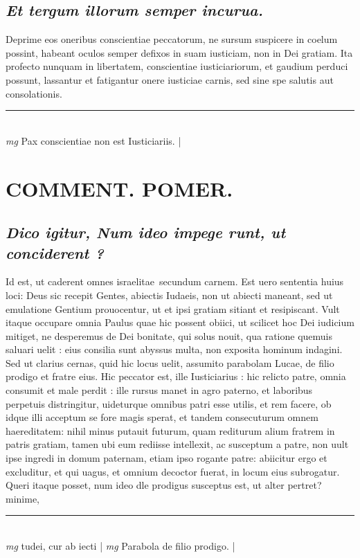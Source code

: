 \documentclass{article}
\begin{document}
\begin{pages}
\subsection*{\textit{Et tergum illorum semper incurua. }}\pstart Deprime eos oneribus conscientiae peccatorum, ne sursum suspicere in coelum possint, habeant oculos semper defixos in suam iusticiam, non in Dei gratiam. Ita profecto nunquam in libertatem, conscientiae iusticiariorum, et gaudium perduci possunt, lassantur et fatigantur onere iusticiae carnis, sed sine spe salutis aut consolationis.   \pend
\vspace{0.5cm}\noindent
\vspace{0.2cm}\rule{1cm}{0.2pt}\\ 
\hspace{0.2cm}\textit{mg}
\footnotesize Pax conscientiae non est Iusticiariis.  
\normalsize| 
\section*{COMMENT. POMER.  }
{}
\subsection*{\textit{Dico igitur, Num ideo impege runt, ut conciderent ? }}\pstart Id est, ut caderent omnes israelitae secundum carnem. Est uero sententia huius loci: Deus sic recepit Gentes, abiectis Iudaeis, non ut abiecti maneant, sed ut emulatione Gentium prouocentur, ut et ipsi gratiam sitiant et resipiscant. Vult itaque occupare omnia Paulus quae hic possent obiici, ut scilicet hoc Dei iudicium mitiget, ne desperemus de Dei bonitate, qui solus nouit, qua ratione quemuis saluari uelit : eius consilia sunt abyssus multa, non exposita hominum indagini. Sed ut clarius cernas, quid hic locus uelit, assumito parabolam Lucae, de filio prodigo et fratre eius. Hic peccator est, ille Iusticiarius : hic relicto patre, omnia consumit et male perdit : ille rursus manet in agro paterno, et laboribus perpetuis distringitur, uideturque omnibus patri esse utilis, et rem facere, ob idque illi acceptum se fore magis sperat, et tandem consecuturum omnem haereditatem: nihil minus putauit futurum, quam rediturum alium fratrem in patris gratiam, tamen ubi eum rediisse intellexit, ac susceptum a patre, non uult ipse ingredi in domum paternam, etiam ipso rogante patre: abiicitur ergo et excluditur, et qui uagus, et omnium decoctor fuerat, in locum eius subrogatur. Queri itaque posset, num ideo dle prodigus susceptus est, ut alter pertret? minime,  \pend
\vspace{0.5cm}\noindent
\vspace{0.2cm}\rule{1cm}{0.2pt}\\ 
\hspace{0.2cm}\textit{mg}
\footnotesize tudei, cur ab iecti
\normalsize| 
\hspace{0.2cm}\textit{mg}
\footnotesize Parabola de filio prodigo. 
\normalsize| 

\end{pages}
\end{document}
